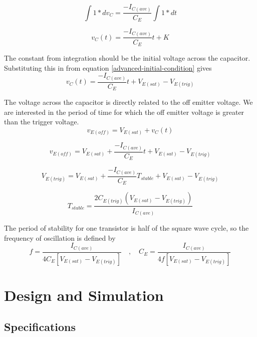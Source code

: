 \documentclass[titlepage, letterpaper, 10.5pt]{article}
\begin{document}
\begin{equation*}
\int 1*dv_{C}=\frac{-I_{C(ave)}}{C_{E}}\int 1*dt
\end{equation*}

\begin{equation*}
v_{C}(t)=\frac{-I_{C(ave)}}{C_{E}}t+K
\end{equation*}

The constant from integration should be the initial voltage across the capacitor.
Substituting this in from equation \ref{advanced-initial-condition} gives
\begin{equation}
v_{C}(t)=\frac{-I_{C(ave)}}{C_{E}}t+V_{E(sat)}-V_{E(trig)}
\end{equation}

The voltage across the capacitor is directly related to the off emitter voltage.
We are interested in the period of time for which the off emitter voltage is greater
than the trigger voltage.
\begin{equation*}
v_{E(off)}=V_{E(sat)}+v_{C}(t)
\end{equation*}

\begin{equation*}
v_{E(off)}=V_{E(sat)}+\frac{-I_{C(ave)}}{C_{E}}t+V_{E(sat)}-V_{E(trig)}
\end{equation*}

\begin{equation*}
V_{E(trig)}=V_{E(sat)}+\frac{-I_{C(ave)}}{C_{E}}T_{stable}+V_{E(sat)}-V_{E(trig)}
\end{equation*}

\begin{equation}
T_{stable}=\frac{2C_{E(trig)}(V_{E(sat)}-V_{E(trig)})}{I_{C(ave)}}
\end{equation}

The period of stability for one transistor is half of the square wave cycle,
so the frequency of oscillation is defined by
\begin{equation}
f=\frac{I_{C(ave)}}{4C_{E}[V_{E(sat)}-V_{E(trig)}]}
\quad, \quad
C_{E}=\frac{I_{C(ave)}}{4f[V_{E(sat)}-V_{E(trig)}]}
\end{equation}

\section{Design and Simulation}

\subsection{Specifications}
\end{document}
